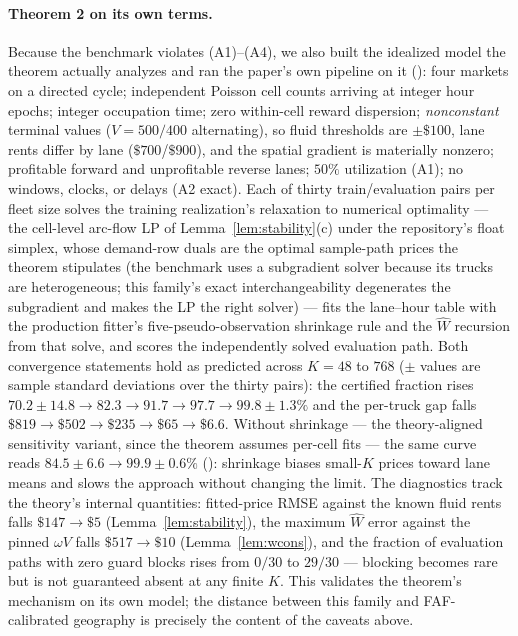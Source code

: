 \documentclass[11pt]{article}
\begin{document}
\paragraph{Theorem 2 on its own terms.} Because the benchmark
violates (A1)--(A4), we also built the idealized model the theorem
actually analyzes and ran the paper's own pipeline on it
(): four markets on a directed
cycle; independent Poisson cell counts arriving at integer hour
epochs; integer occupation time; zero within-cell reward dispersion;
\emph{nonconstant} terminal values ($V = 500/400$ alternating), so
fluid thresholds are $\pm\$100$, lane rents differ by lane
($\$700$/$\$900$), and the spatial gradient is materially nonzero;
profitable forward and unprofitable reverse lanes; $50\%$
utilization (A1); no windows, clocks, or delays (A2 exact). Each of
thirty train/evaluation pairs per fleet size solves the training
realization's relaxation to numerical optimality --- the cell-level
arc-flow LP of Lemma~\ref{lem:stability}(c) under the repository's
float simplex, whose demand-row duals are the
optimal sample-path prices the theorem stipulates (the benchmark uses
a subgradient solver because its trucks are heterogeneous; this
family's exact interchangeability degenerates the subgradient and
makes the LP the right solver) --- fits the lane--hour table with the
production fitter's five-pseudo-observation shrinkage rule and the
$\widehat{W}$ recursion from that solve, and scores the
independently solved evaluation path. Both convergence statements
hold as predicted across $K = 48$ to $768$ ($\pm$ values are sample
standard deviations over the thirty pairs): the certified fraction
rises $70.2 \pm 14.8 \to 82.3 \to 91.7 \to 97.7 \to
99.8 \pm 1.3\%$ and the per-truck gap falls
$\$819 \to \$502 \to \$235 \to \$65 \to \$6.6$. Without
shrinkage --- the theory-aligned sensitivity variant, since the
theorem assumes per-cell fits --- the same curve reads
$84.5 \pm 6.6 \to 99.9 \pm 0.6\%$
():
shrinkage biases small-$K$ prices toward lane means and slows the
approach without changing the limit. The
diagnostics track the theory's internal quantities: fitted-price RMSE
against the known fluid rents falls $\$147 \to \$5$
(Lemma~\ref{lem:stability}), the maximum $\widehat{W}$ error
against the pinned $\omega V$ falls $\$517 \to \$10$
(Lemma~\ref{lem:wcons}), and the fraction of evaluation paths with
zero guard blocks rises from $0/30$ to $29/30$ --- blocking becomes
rare but is not guaranteed absent at any finite $K$. This validates
the theorem's mechanism on its own model; the distance between this
family and FAF-calibrated geography is precisely the content of the
caveats above.
\end{document}
